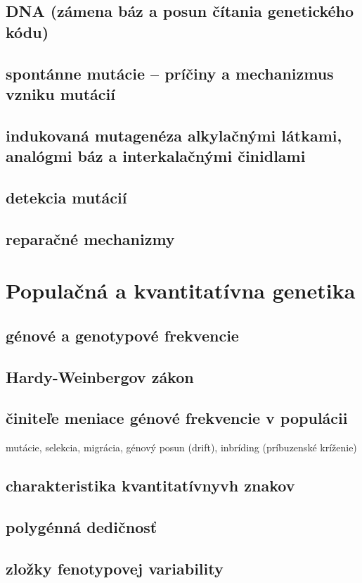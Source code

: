 \subsection{DNA (zámena báz a posun čítania genetického kódu)}
\subsection{spontánne mutácie -- príčiny a mechanizmus vzniku mutácií}
\subsection{indukovaná mutagenéza alkylačnými látkami, analógmi báz a interkalačnými činidlami}
\subsection{detekcia mutácií}
\subsection{reparačné mechanizmy}

\section{Populačná a kvantitatívna genetika}
\subsection{génové a genotypové frekvencie}
\subsection{Hardy-Weinbergov zákon}
\subsection{činiteľe meniace génové frekvencie v populácii}
mutácie, selekcia, migrácia, génový posun (drift), inbríding (príbuzenské kríženie)\\
\subsection{charakteristika kvantitatívnyvh znakov}
\subsection{polygénná dedičnosť}
\subsection{zložky fenotypovej variability}
